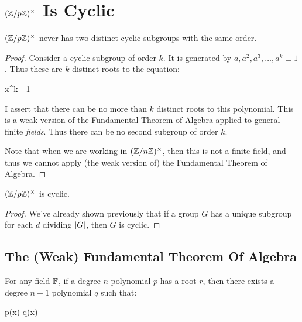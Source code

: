 \section{$\mathopen{}\left( {\mathbb{Z} / p\mathbb{Z}} \right)\mathclose{}^\times$ Is Cyclic}

\begin{lemma}
  $\mathopen{}\left( {\mathbb{Z} / p\mathbb{Z}} \right)\mathclose{}^\times$ never has two distinct cyclic subgroups with the same order.
\end{lemma}

\begin{proof}
  Consider a cyclic subgroup of order $k$. It is generated by $a, a^2,
  a^3, \ldots, a^k \equiv 1$. Thus these are $k$ distinct roots to the
  equation:

  \begin{nedqn}
    x^k - 1
  \end{nedqn}

  \noindent
  I assert that there can be no more than $k$ distinct roots to this
  polynomial. This is a weak version of the Fundamental Theorem of
  Algebra applied to general finite \emph{fields}. Thus there can be no
  second subgroup of order $k$.

  Note that when we are working in $\mathopen{}\left( {\mathbb{Z} / n\mathbb{Z}} \right)\mathclose{}^\times$, then this is not a finite
  field, and thus we cannot apply (the weak version of) the Fundamental
  Theorem of Algebra.
\end{proof}

\begin{corollary}
  $\mathopen{}\left( {\mathbb{Z} / p\mathbb{Z}} \right)\mathclose{}^\times$ is cyclic.
\end{corollary}

\begin{proof}
  We've already shown previously that if a group $G$ has a unique
  subgroup for each $d$ dividing $|G|$, then $G$ is cyclic.
\end{proof}

\subsection{The (Weak) Fundamental Theorem Of Algebra}

\begin{lemma}
  For any field $\mathbb{F}$, if a degree $n$ polynomial $p$ has a root $r$,
  then there exists a degree $n-1$ polynomial $q$ such that:

  \begin{nedqn}
    p(x)
  \eqcol
    q(x)
  \end{nedqn}
\end{lemma}

